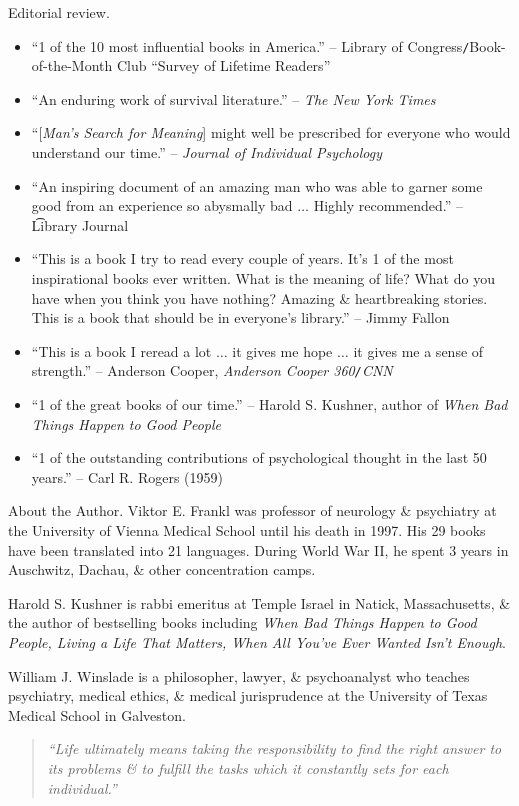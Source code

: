 \documentclass{article}
\begin{document}
\begin{enumerate}
	{\sf Editorial review.}
	\begin{itemize}
		\item ``1 of the 10 most influential books in America.'' -- Library of Congress{\tt/}Book-of-the-Month Club ``Survey of Lifetime Readers''
		\item ``An enduring work of survival literature.'' -- {\it The New York Times}
		\item ``[{\it Man's Search for Meaning}] might well be prescribed for everyone who would understand our time.'' -- {\it Journal of Individual Psychology}
		\item ``An inspiring document of an amazing man who was able to garner some good from an experience so abysmally bad $\ldots$ Highly recommended.'' -- {\t Library Journal}
		\item ``This is a book I try to read every couple of years. It's 1 of the most inspirational books ever written. What is the meaning of life? What do you have when you think you have nothing? Amazing \& heartbreaking stories. This is a book that should be in everyone's library.'' -- {\sc Jimmy Fallon}
		\item ``This is a book I reread a lot $\ldots$ it gives me hope $\ldots$ it gives me a sense of strength.'' -- {\sf Anderson Cooper}, {\it Anderson Cooper 360{\tt/}CNN}
		\item ``1 of the great books of our time.'' -- {\sc Harold S. Kushner}, author of {\it When Bad Things Happen to Good People}
		\item ``1 of the outstanding contributions of psychological thought in the last 50 years.'' -- {\sc Carl R. Rogers} (1959)
	\end{itemize}
	{\sf About the Author.} {\sc Viktor E. Frankl} was professor of neurology \& psychiatry at the University of Vienna Medical School until his death in 1997. His 29 books have been translated into 21 languages. During World War II, he spent 3 years in Auschwitz, Dachau, \& other concentration camps.

	{\sc Harold S. Kushner} is rabbi emeritus at Temple Israel in Natick, Massachusetts, \& the author of bestselling books including {\it When Bad Things Happen to Good People, Living a Life That Matters, When All You've Ever Wanted Isn't Enough}.

	{\sc William J. Winslade} is a philosopher, lawyer, \& psychoanalyst who teaches psychiatry, medical ethics, \& medical jurisprudence at the University of Texas Medical School in Galveston.
	\begin{quotation}
		{\it``Life ultimately means taking the responsibility to find the right answer to its problems \& to fulfill the tasks which it constantly sets for each individual.''}


\end{quotation}
\end{enumerate}
\end{document}
